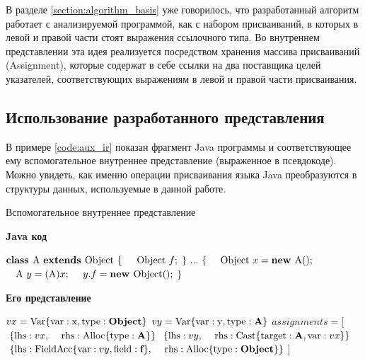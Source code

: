 \documentclass[14pt,titlepage]{extarticle}
\newcommand{\algorithmictitle}[1]{\hspace{8mm}\textbf{#1}}
\newcommand{\eng}[1]{{\English#1}}
\begin{document}
      В разделе \ref{section:algorithm_basis} уже говорилось, что разработанный
      алгоритм работает с анализируемой программой, как с набором присваиваний,
      в которых в левой и правой части стоят выражения ссылочного типа. Во
      внутреннем представлении эта идея реализуется посредством хранения
      массива присваиваний (\eng{Assignment}), которые содержат в себе ссылки
      на два поставщика целей указателей, соответствующих выражениям в левой и
      правой части присваивания.

    \subsection{Использование разработанного представления}

      В примере \ref{code:aux_ir} показан фрагмент Java программы и
      соответствующее ему вспомогательное внутреннее представление (выраженное в
      псевдокоде).
      Можно увидеть, как именно операции присваивания языка Java преобразуются
      в структуры данных, используемые в данной работе.

      \begin{algorithm}
        \caption{Вспомогательное внутреннее представление}
        \label{code:aux_ir}
        \begin{multicols*}{2}
          \algorithmictitle{Java код}
          \begin{algorithmic}
            \STATE $\textbf{class }\textmd{A }%
                    \textbf{extends }\textmd{Object }\{$
            \STATE $\textmd{\quad Object }f;$
            \STATE $\}$
            \STATE $\ldots$
            \STATE $\{$
            \STATE $\textmd{\quad Object }x = \textbf{new }\textmd{A}();$
            \STATE $\textmd{\quad A }y = (\textmd{A})x;$
            \STATE $\textmd{\quad}y.f = \textbf{new }\textmd{Object}();$
            \STATE $\}$
          \end{algorithmic}
          \columnbreak
          \algorithmictitle{Его представление}
          \begin{algorithmic}
            \STATE $vx = \textmd{Var}\{\textmd{var}: \textmd{x},%
                              \textmd{type}: \textbf{Object}\}$
            \STATE $vy = \textmd{Var}\{\textmd{var}: \textmd{y},%
                              \textmd{type}: \textbf{A}\}$
            \STATE $assignments = [$
            \STATE $\textmd{\ }\{ \textmd{lhs}: vx,$
            \STATE $\textmd{\ \, rhs}: \textmd{Alloc}\{\textmd{type}: \textbf{A}\}\}$
            \STATE $\textmd{\ }\{ \textmd{lhs}: vy,$
            \STATE $\textmd{\ \, rhs}: \textmd{Cast}\{\textmd{target}: \textbf{A}, \textmd{var}: vx\}\}$
            \STATE $\textmd{\ }\{ \textmd{lhs}: \textmd{FieldAcc}\{\textmd{var}: vy, \textmd{field}: \textbf{f}\},$
            \STATE $\textmd{\ \, rhs}: \textmd{Alloc}\{\textmd{type}: \textbf{Object}\}\}$
            \STATE $]$
          \end{algorithmic}
        \end{multicols*}
      \end{algorithm}
\end{document}
